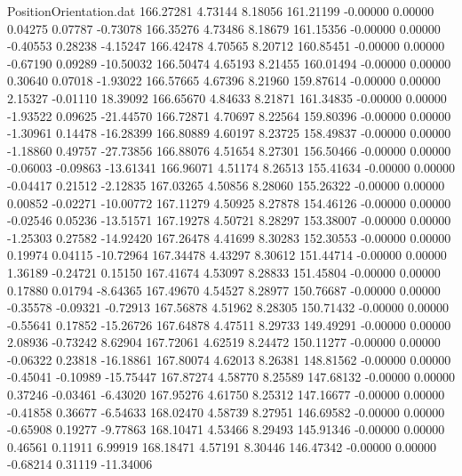 \begin{filecontents}{PositionOrientation.dat}
 166.27281    4.73144    8.18056   161.21199   -0.00000    0.00000    0.04275    0.07787   -0.73078
 166.35276    4.73486    8.18679   161.15356   -0.00000    0.00000   -0.40553    0.28238   -4.15247
 166.42478    4.70565    8.20712   160.85451   -0.00000    0.00000   -0.67190    0.09289  -10.50032
 166.50474    4.65193    8.21455   160.01494   -0.00000    0.00000    0.30640    0.07018   -1.93022
 166.57665    4.67396    8.21960   159.87614   -0.00000    0.00000    2.15327   -0.01110   18.39092
 166.65670    4.84633    8.21871   161.34835   -0.00000    0.00000   -1.93522    0.09625  -21.44570
 166.72871    4.70697    8.22564   159.80396   -0.00000    0.00000   -1.30961    0.14478  -16.28399
 166.80889    4.60197    8.23725   158.49837   -0.00000    0.00000   -1.18860    0.49757  -27.73856
 166.88076    4.51654    8.27301   156.50466   -0.00000    0.00000   -0.06003   -0.09863  -13.61341
 166.96071    4.51174    8.26513   155.41634   -0.00000    0.00000   -0.04417    0.21512   -2.12835
 167.03265    4.50856    8.28060   155.26322   -0.00000    0.00000    0.00852   -0.02271  -10.00772
 167.11279    4.50925    8.27878   154.46126   -0.00000    0.00000   -0.02546    0.05236  -13.51571
 167.19278    4.50721    8.28297   153.38007   -0.00000    0.00000   -1.25303    0.27582  -14.92420
 167.26478    4.41699    8.30283   152.30553   -0.00000    0.00000    0.19974    0.04115  -10.72964
 167.34478    4.43297    8.30612   151.44714   -0.00000    0.00000    1.36189   -0.24721    0.15150
 167.41674    4.53097    8.28833   151.45804   -0.00000    0.00000    0.17880    0.01794   -8.64365
 167.49670    4.54527    8.28977   150.76687   -0.00000    0.00000   -0.35578   -0.09321   -0.72913
 167.56878    4.51962    8.28305   150.71432   -0.00000    0.00000   -0.55641    0.17852  -15.26726
 167.64878    4.47511    8.29733   149.49291   -0.00000    0.00000    2.08936   -0.73242    8.62904
 167.72061    4.62519    8.24472   150.11277   -0.00000    0.00000   -0.06322    0.23818  -16.18861
 167.80074    4.62013    8.26381   148.81562   -0.00000    0.00000   -0.45041   -0.10989  -15.75447
 167.87274    4.58770    8.25589   147.68132   -0.00000    0.00000    0.37246   -0.03461   -6.43020
 167.95276    4.61750    8.25312   147.16677   -0.00000    0.00000   -0.41858    0.36677   -6.54633
 168.02470    4.58739    8.27951   146.69582   -0.00000    0.00000   -0.65908    0.19277   -9.77863
 168.10471    4.53466    8.29493   145.91346   -0.00000    0.00000    0.46561    0.11911    6.99919
 168.18471    4.57191    8.30446   146.47342   -0.00000    0.00000   -0.68214    0.31119  -11.34006

\end{filecontents}
